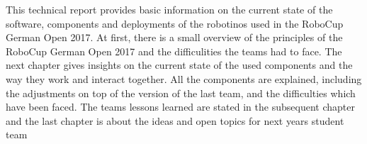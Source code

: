 This technical report provides basic information on the current state of the software, components and deployments of the robotinos used in the RoboCup German Open 2017. At first, there is a small overview of the principles of the RoboCup German Open 2017 and the difficulities the teams had to face. The next chapter gives insights on the current state of the used components and the way they work and interact together. All the components are explained, including the adjustments on top of the version of the last team, and the difficulties which have been faced. The teams lessons learned are stated in the subsequent chapter and the last chapter is about the ideas and open topics for next years student team